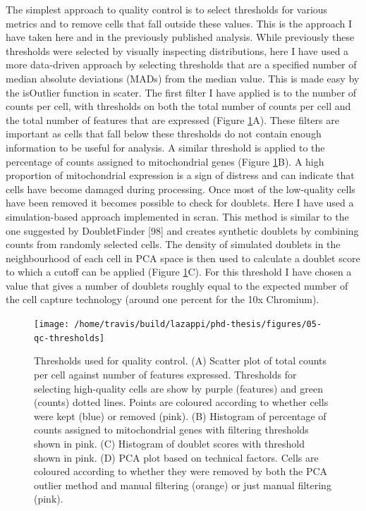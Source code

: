 \documentclass[11pt,a4paper,titlepage,twoside,openright]{style/unimelbthesis}
\theoremstyle{definition}
\theoremstyle{definition}
\theoremstyle{definition}
\theoremstyle{remark}
\begin{document}
\begin{mainmatter}
The simplest approach to quality control is to select thresholds for various metrics and to remove cells that fall outside these values. This is the approach I have taken here and in the previously published analysis. While previously these thresholds were selected by visually inspecting distributions, here I have used a more data-driven approach by selecting thresholds that are a specified number of median absolute deviations (MADs) from the median value. This is made easy by the isOutlier function in scater. The first filter I have applied is to the number of counts per cell, with thresholds on both the total number of counts per cell and the total number of features that are expressed (Figure \ref{fig:qc-thresholds}A). These filters are important as cells that fall below these thresholds do not contain enough information to be useful for analysis. A similar threshold is applied to the percentage of counts assigned to mitochondrial genes (Figure \ref{fig:qc-thresholds}B). A high proportion of mitochondrial expression is a sign of distress and can indicate that cells have become damaged during processing. Once most of the low-quality cells have been removed it becomes possible to check for doublets. Here I have used a simulation-based approach implemented in scran. This method is similar to the one suggested by DoubletFinder {[}98{]} and creates synthetic doublets by combining counts from randomly selected cells. The density of simulated doublets in the neighbourhood of each cell in PCA space is then used to calculate a doublet score to which a cutoff can be applied (Figure \ref{fig:qc-thresholds}C). For this threshold I have chosen a value that gives a number of doublets roughly equal to the expected number of the cell capture technology (around one percent for the 10x Chromium).

\begin{figure}

{\centering \texttt{[image: /home/travis/build/lazappi/phd-thesis/figures/05-qc-thresholds]} 

}

\caption[Thresholds used for quality control.]{Thresholds used for quality control. (A) Scatter plot of total counts per cell against number of features expressed. Thresholds for selecting high-quality cells are show by purple (features) and green (counts) dotted lines. Points are coloured according to whether cells were kept (blue) or removed (pink). (B) Histogram of percentage of counts assigned to mitochondrial genes with filtering thresholds shown in pink. (C) Histogram of doublet scores with threshold shown in pink. (D) PCA plot based on technical factors. Cells are coloured according to whether they were removed by both the PCA outlier method and manual filtering (orange) or just manual filtering (pink).}\label{fig:qc-thresholds}
\end{figure}






\end{mainmatter}
\end{document}
